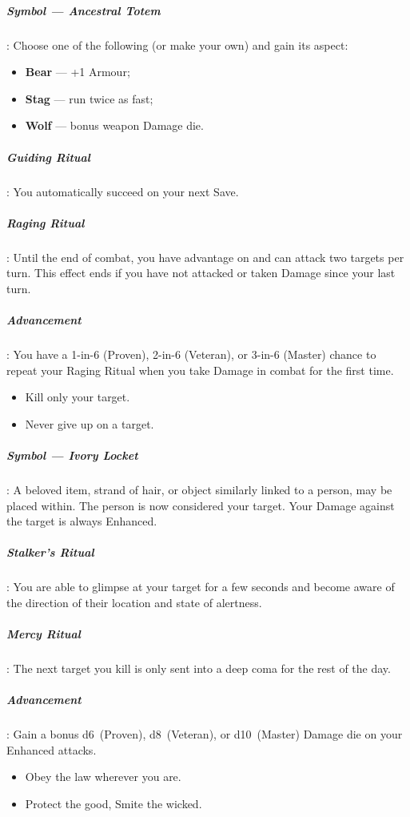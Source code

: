\documentclass[itdr]{subfiles}
\begin{document}
\subparagraph{Symbol --- Ancestral Totem}: Choose one of the following (or make your own) and gain its aspect:
\begin{itemize}
	\item \textbf{Bear} --- +1 Armour;
	\item \textbf{Stag} --- run twice as fast;
	\item \textbf{Wolf} --- bonus weapon Damage die.
\end{itemize}

\subparagraph{Guiding Ritual}: You automatically succeed on your next Save.

\subparagraph{Raging Ritual}: Until the end of combat, you have advantage on  and can attack two targets per turn. This effect ends if you have not attacked or taken Damage since your last turn.

\subparagraph{Advancement}: You have a 1-in-6 (Proven), 2-in-6 (Veteran), or 3-in-6 (Master) chance to repeat your Raging Ritual when you take Damage in combat for the first time.

\vfill
\break

{\em\begin{itemize}
		\item Kill only your target.
		\item Never give up on a target.
\end{itemize}}

\subparagraph{Symbol --- Ivory Locket}: A beloved item, strand of hair, or object similarly linked to a person, may be placed within. The person is now considered your target. Your Damage against the target is always Enhanced.

\subparagraph{Stalker's Ritual}: You are able to glimpse at your target for a few seconds and become aware of the direction of their location and state of alertness.

\subparagraph{Mercy Ritual}: The next target you kill is only sent into a deep coma for the rest of the day.

\subparagraph{Advancement}: Gain a bonus d6~(Proven), d8~(Veteran), or d10~(Master) Damage die on your Enhanced attacks.

\vfill

{\em\begin{itemize}
		\item Obey the law wherever you are.
		\item Protect the good, Smite the wicked.
\end{itemize}}
\end{document}
